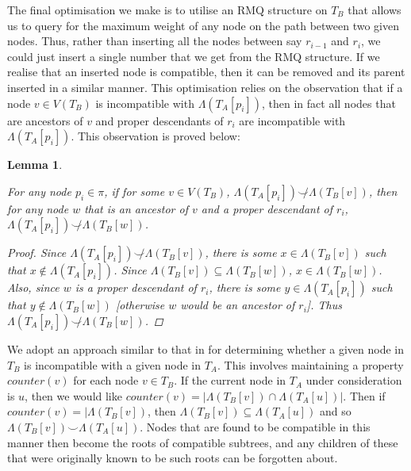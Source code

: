 \documentclass{article}
\newcommand{\compatible}{\smile}
\newcommand{\leafset}{\Lambda}
\newtheorem{filterclustersfindingcompatibletermination}[incompatibility]{Lemma}
\begin{document}
    The final optimisation we make is to utilise an RMQ structure on $T_B$ that allows us to query for the maximum weight of any node on the path between two given nodes. Thus, rather than inserting all the nodes between say $r_{i-1}$ and $r_i$, we could just insert a single number that we get from the RMQ structure. If we realise that an inserted node is compatible, then it can be removed and its parent inserted in a similar manner. This optimisation relies on the observation that if a node $v \in V(T_B)$ is incompatible with $\leafset(T_A[p_i])$, then in fact all nodes that are ancestors of $v$ and proper descendants of $r_i$ are incompatible with $\leafset(T_A[p_i])$. This observation is proved below:

    \begin{filterclustersfindingcompatibletermination}
        \label{lem:filterclustersfindingcompatibletermination}

        For any node $p_i \in \pi$, if for some $v \in V(T_B)$, $\leafset(T_A[p_i]) \not\compatible \leafset(T_B[v])$, then for any node $w$ that is an ancestor of $v$ and a proper descendant of $r_i$, $\leafset(T_A[p_i]) \not\compatible \leafset(T_B[w])$.

        \begin{proof}
            Since $\leafset(T_A[p_i]) \not\compatible \leafset(T_B[v])$, there is some $x \in \leafset(T_B[v])$ such that $x \not\in \leafset(T_A[p_i])$. Since $\leafset(T_B[v]) \subseteq \leafset(T_B[w])$, $x \in \leafset(T_B[w])$. Also, since $w$ is a proper descendant of $r_i$, there is some $y \in \leafset(T_A[p_i])$ such that $y \not\in \leafset(T_B[w])$ [otherwise $w$ would be an ancestor of $r_i$]. Thus $\leafset(T_A[p_i]) \not\compatible \leafset(T_B[w])$.
        \end{proof}
    \end{filterclustersfindingcompatibletermination}

    We adopt an approach similar to that in \cite{jansson2018algorithms} for determining whether a given node in $T_B$ is incompatible with a given node in $T_A$. This involves maintaining a property $counter(v)$ for each node $v \in T_B$. If the current node in $T_A$ under consideration is $u$, then we would like $counter(v) = |\leafset(T_B[v]) \cap \leafset(T_A[u])|$. Then if $counter(v) = |\leafset(T_B[v])$, then $\leafset(T_B[v]) \subseteq \leafset(T_A[u])$ and so $\leafset(T_B[v]) \compatible \leafset(T_A[u])$. Nodes that are found to be compatible in this manner then become the roots of compatible subtrees, and any children of these that were originally known to be such roots can be forgotten about.
\end{document}

